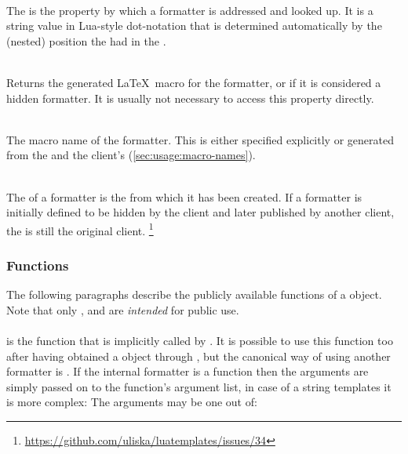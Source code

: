 \documentclass[12pt]{scrartcl}
\begin{document}
\begin{itemize*}
\item {}\\
The  is the property by which a formatter is addressed and looked
up.  It is a string value in Lua-style dot-notation that is determined
automatically by the (nested) position the  had in the
.

\item {}\\
Returns the generated \LaTeX\ macro for the formatter, or  if it is
considered a hidden formatter.  It is usually not necessary to access this
property directly.

\item {}\\
The macro name of the formatter.  This is either specified explicitly or
generated from the  and the client's 
(\vref{sec:usage:macro-names}).

\item {}\\
The  of a formatter is the  from which it has been
created.  If a formatter is initially defined to be hidden by the client and
later published by another client, the  is still the original
client.%
\footnote{ \url{https://github.com/uliska/luatemplates/issues/34}}

\end{itemize*}


\subsubsection{ Functions}
\label{sec:advanced:formatter-functions}

The following paragraphs describe the publicly available functions of a
 object.  Note that only ,
 and  are \emph{intended} for public
use.


\paragraph{}
\label{sec:advanced:formatter:apply}

is the function that is implicitly called by .  It is
possible to use this function too after having obtained a 
object through , but the canonical way of using
another formatter is .  If the internal formatter
is a function then the  arguments are simply passed on to the
function's argument list, in case of a string templates it is more complex: The
arguments may be one out of:
\end{document}
